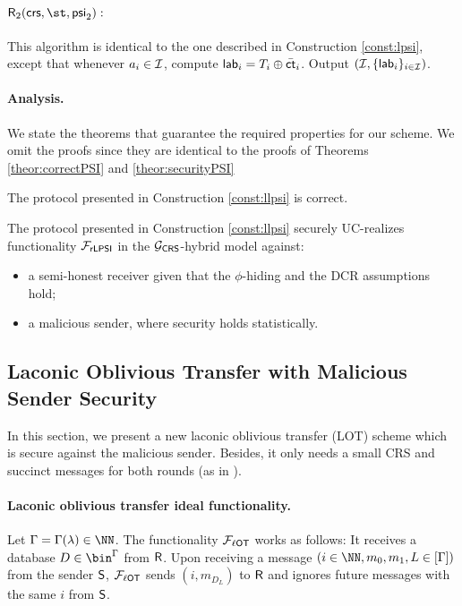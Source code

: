 \begin{construction}
\paragraph{$\Rs_2(\crs,\st,\mathsf{psi}_2):$}  This algorithm is identical to the one described in Construction \ref{const:lpsi}, except that whenever $a_i\in\mathcal{I}$, compute $\mathsf{lab}_i=T_i\oplus \bar{\mathsf{ct}}_i$. Output $(\mathcal{I},\{\mathsf{lab}_i\}_{i\in\mathcal{I}})$.
\end{construction}




\paragraph{Analysis.} We state the theorems that guarantee the required properties for our scheme. We omit the proofs since they are identical to the proofs of Theorems \ref{theor:correctPSI} and \ref{theor:securityPSI}

\begin{theorem}
\label{theor:correctLLPSI}
The protocol presented in Construction \ref{const:llpsi} is correct.
\end{theorem}

\begin{theorem}
\label{theor:secureLLPSI}
The protocol presented in Construction \ref{const:llpsi} securely UC-realizes functionality $\mathcal{F}_\mathsf{rLPSI}$ in the $\mathcal{G}_\mathsf{CRS}$-hybrid model against:
\begin{itemize}
    \item a semi-honest receiver given that the $\phi$-hiding and the DCR assumptions hold;
    \item a malicious sender, where security holds statistically.
\end{itemize}
\end{theorem}


\subsection{Laconic Oblivious Transfer with Malicious Sender Security}
\label{sec:lot}

In this section, we present a new laconic oblivious transfer (LOT) scheme which is secure against the malicious sender. Besides, it only needs a small CRS and succinct messages for both rounds (as in \cite{C:GoyVusWat20}).

\paragraph{Laconic oblivious transfer ideal functionality.} Let $\Gamma=\Gamma(\lambda)\in\NN$. The functionality $\mathcal{F}_{\ell\mathsf{OT}}$ works as follows: It receives a  database $D\in\bin^{\Gamma}$ from $\mathsf{R}$. Upon receiving a message $(i\in \NN, m_0,m_1,L\in [\Gamma])$ from the sender $\mathsf{S}$, $\mathcal{F}_{\ell\mathsf{OT}}$ sends $(i,m_{D_L})$ to $\mathsf{R}$ and ignores future messages with the same $i$ from $\mathsf{S}$.


